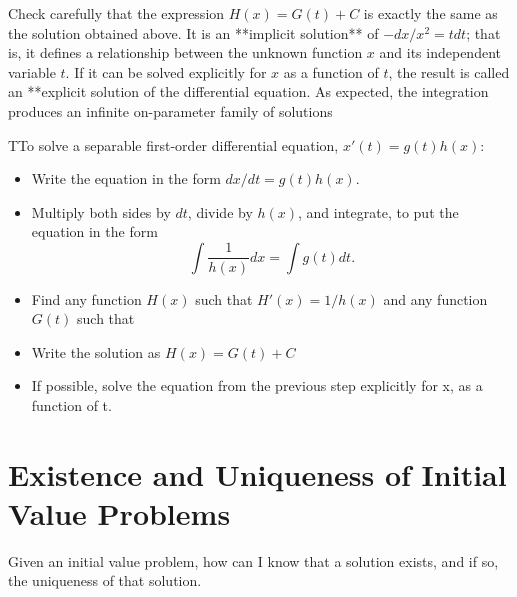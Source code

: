   Check carefully that the expression $H(x)=G(t)+C$ is exactly the same as the solution obtained above. It is an **implicit solution** of $-dx/x^2=tdt$; that is, it defines a relationship between the unknown function $x$ and its independent variable $t$. If it can be solved explicitly for $x$ as a function of $t$, the result is called an **explicit solution of the differential equation. As expected, the integration produces an infinite on-parameter family of solutions

  \begin{theorem}
    TTo solve a separable first-order differential equation, $x'(t)=g(t)h(x)$:
    \begin{itemize}
      \item Write the equation in the form $dx/dt=g(t)h(x)$.
      \item Multiply both sides by $dt$, divide by $h(x)$, and integrate, to put the equation in the form 
        \begin{equation}
          \int \frac{1}{h(x)}dx =\int g(t)dt.
        \end{equation}
      \item Find any function $H(x)$ such that $H'(x)=1/h(x)$ and any function $G(t)$ such that %
      \item Write the solution as $H(x)=G(t)+C$
      \item If possible, solve the equation from the previous step explicitly for x, as a function of t.
    \end{itemize}
  \end{theorem}

\section{}
\section{}

\section{Existence and Uniqueness of Initial Value Problems}

  Given an initial value problem, how can I know that a solution exists, and if so, the uniqueness of that solution.

